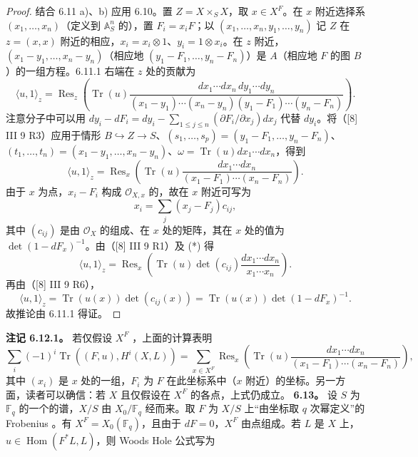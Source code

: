 \begin{proof}
结合 6.11 a)、b) 应用 6.10。置 $Z=X\times_SX$，取 $x\in X^F$。在 $x$ 附近选择系 $(x_1,\ldots,x_n)$（定义到 $\mathbb A_S^n$ 的），置 $F_i=x_iF$；以 $(x_1,\ldots,x_n,y_1,\ldots,y_n)$ 记 $Z$ 在 $z=(x,x)$ 附近的相应，$x_i=x_i\otimes1$、$y_i=1\otimes x_i$。在 $z$ 附近，$(x_1-y_1,\ldots,x_n-y_n)$（相应地 $(y_1-F_1,\ldots,y_n-F_n)$）是 $A$（相应地 $F$ 的图 $B$）的一组方程。6.11.1 右端在 $z$ 处的贡献为
\[\langle u,1\rangle_z=\operatorname{Res}_z\left(\operatorname{Tr}(u)\frac{dx_1\cdots dx_n\,dy_1\cdots dy_n}{(x_1-y_1)\cdots(x_n-y_n)(y_1-F_1)\cdots(y_n-F_n)}\right).\]
注意分子中可以用 $dy_i-dF_i=dy_i-\sum_{1\leq j\leq n}(\partial F_i/\partial x_j)dx_j$ 代替 $dy_i$。将（[8] III 9 R3）应用于情形 $B\hookrightarrow Z\to S$、$(s_1,\ldots,s_p)=(y_1-F_1,\ldots,y_n-F_n)$、$(t_1,\ldots,t_n)=(x_1-y_1,\ldots,x_n-y_n)$、$\omega=\operatorname{Tr}(u)dx_1\cdots dx_n$，得到
\[\langle u,1\rangle_z=\operatorname{Res}_x\left(\operatorname{Tr}(u)\frac{dx_1\cdots dx_n}{(x_1-F_1)\cdots(x_n-F_n)}\right).\tag{*}\]
由于 $x$ 为点，$x_i-F_i$ 构成 $\mathcal O_{X,x}$ 的，故在 $x$ 附近可写为
\[x_i=\sum_j(x_j-F_j)c_{ij},\]
其中 $(c_{ij})$ 是由 $\mathcal O_X$ 的组成、在 $x$ 处的矩阵，其在 $x$ 处的值为 $\det(1-dF_x)^{-1}$。由（[8] III 9 R1）及 (*) 得
\[\langle u,1\rangle_z=\operatorname{Res}_x\left(\operatorname{Tr}(u)\det(c_{ij})\frac{dx_1\cdots dx_n}{x_1\cdots x_n}\right).\]
再由（[8] III 9 R6），
\[\langle u,1\rangle_z=\operatorname{Tr}(u(x))\det(c_{ij}(x))=\operatorname{Tr}(u(x))\det(1-dF_x)^{-1}.\]
故推论由 6.11.1 得证。
\end{proof}
\textbf{注记 6.12.1。} 若仅假设 $X^F$ ，上面的计算表明
\[\sum_i(-1)^i\operatorname{Tr}((F,u),H^i(X,L))=\sum_{x\in X^F}\operatorname{Res}_x\left(\operatorname{Tr}(u)\frac{dx_1\cdots dx_n}{(x_1-F_1)\cdots(x_n-F_n)}\right),\]
其中 $(x_i)$ 是 $x$ 处的一组，$F_i$ 为 $F$ 在此坐标系中（$x$ 附近）的坐标。另一方面，读者可以确信：若 $X$ 且仅假设在 $X^F$ 的各点，上式仍成立。
\textbf{6.13。} 设 $S$ 为 $\mathbb F_q$ 的一个的谱，$X/S$ 由 $X_0/\mathbb F_q$ 经而来。取 $F$ 为 $X/S$ 上“由坐标取 $q$ 次幂定义”的 Frobenius 。有 $X^F=X_0(\mathbb F_q)$，且由于 $dF=0$，$X^F$ 由点组成。若 $L$ 是 $X$ 上，$u\in\operatorname{Hom}(F^*L,L)$，则 Woods Hole 公式写为

